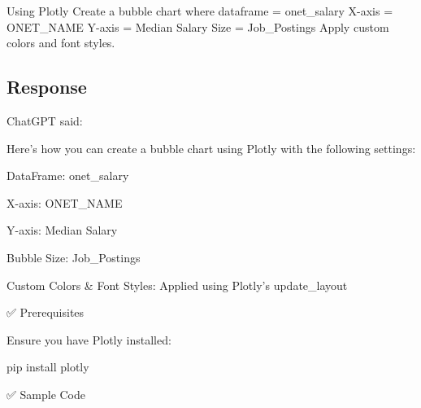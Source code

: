 \documentclass[
  letterpaper,
  DIV=11,
  numbers=noendperiod]{scrartcl}
\newenvironment{Shaded}{\begin{snugshade}}{\end{snugshade}}
\newcommand{\NormalTok}[1]{\textcolor[rgb]{0.00,0.23,0.31}{#1}}
\begin{document}
Using Plotly Create a bubble chart where dataframe = onet\_salary X-axis
= ONET\_NAME Y-axis = Median Salary Size = Job\_Postings Apply custom
colors and font styles.

\subsection{Response}\label{response-3}

ChatGPT said:

Here's how you can create a bubble chart using Plotly with the following
settings:

DataFrame: onet\_salary

X-axis: ONET\_NAME

Y-axis: Median Salary

Bubble Size: Job\_Postings

Custom Colors \& Font Styles: Applied using Plotly's update\_layout

✅ Prerequisites

Ensure you have Plotly installed:

\begin{Shaded}
\begin{Highlighting}[]
\NormalTok{pip install plotly}
\end{Highlighting}
\end{Shaded}

✅ Sample Code
\end{document}
